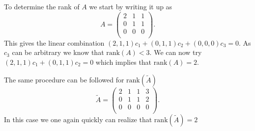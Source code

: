 To determine the rank of $A$ we start by writing it up as
\[ 
A = \begin{pmatrix}
2 & 1 & 1\\
0 & 1 & 1\\
0 & 0 & 0\\
\end{pmatrix}
.\]
This gives the linear combination $(2,1,1)c_1 + (0,1,1)c_2 + (0,0,0)c_3 = 0$. As $c_3$ can be arbitrary we know that $\mathrm{rank}(A) < 3$. We can now try $(2,1,1)c_1 + (0,1,1)c_2 = 0$ which implies that $\mathrm{rank}(A) = 2$.

The same procedure can be followed for $\mathrm{rank}(\tilde{A})$
\[ 
\tilde{A} = \left( \begin{array}{ccc|c}
2 & 1 & 1 & 3\\
0 & 1 & 1 & 2\\
0 & 0 & 0 & 0\\
\end{array} \right)
.\]
In this case we one again quickly can realize that $\mathrm{rank}(\tilde{A}) = 2$


